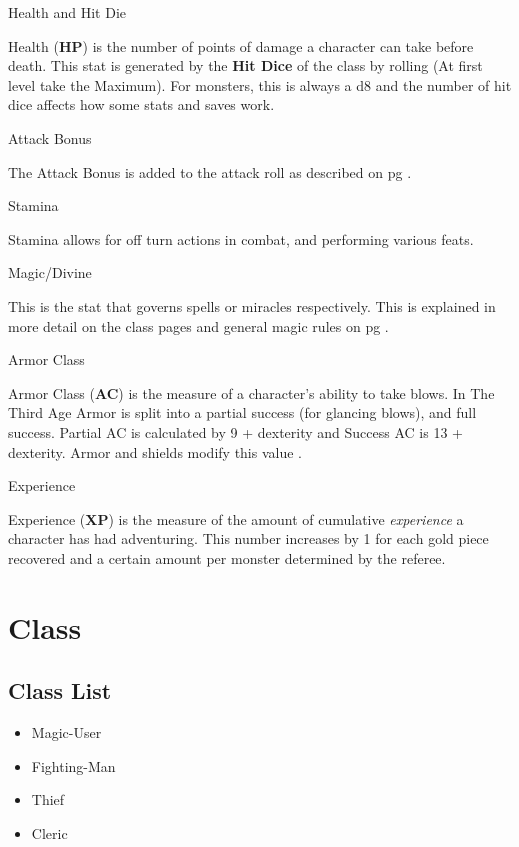 \begin{multicols}{2}
\begin{mercHeading}
Health and Hit Die
\end{mercHeading}
Health (\textbf{HP}) is the number of points of damage a character can take before death. This stat is generated by the \textbf{Hit Dice} of the class by rolling (At first level take the Maximum). For monsters, this is always a d8 and the number of hit dice affects how some stats and saves work.

\begin{mercHeading}
Attack Bonus
\end{mercHeading}
The Attack Bonus is added to the attack roll as described on pg \pageref{label:atkroll}.

\begin{mercHeading}
Stamina
\end{mercHeading}
Stamina allows for off turn actions in combat, and performing various feats.

\begin{mercHeading}
Magic/Divine
\end{mercHeading}
This is the stat that governs spells or miracles respectively. This is explained in more detail on the class pages and general magic rules on pg \pageref{section:GenMagicRules}.

\begin{mercHeading}
Armor Class
\end{mercHeading}
Armor Class (\textbf{AC}) is the measure of a character's ability to take blows. In The Third Age Armor is split into a partial success (for glancing blows), and full success. Partial AC is calculated by 9 + dexterity and Success AC is 13 + dexterity. Armor and shields modify this value \pageref{table:Armor}.

\begin{mercHeading}
Experience
\end{mercHeading}
Experience (\textbf{XP}) is the measure of the amount of cumulative \emph{experience} a character has had adventuring. This number increases by 1 for each gold piece recovered and a certain amount per monster determined by the referee.
\section*{Class}
\subsection*{Class List}
\label{label:Class}
\begin{itemize}
	\item Magic-User
	\item Fighting-Man
	\item Thief
	\item Cleric
\end{itemize}

\end{multicols}